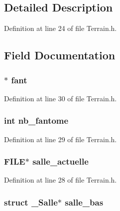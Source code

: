 \subsection{Detailed Description}


Definition at line 24 of file Terrain.\-h.



\subsection{Field Documentation}
\hypertarget{struct___salle_a569b56072a5a66ebf7db5ab24d371550}{
\subsubsection[{fant}]{$\ast$ fant}}\label{struct___salle_a569b56072a5a66ebf7db5ab24d371550}


Definition at line 30 of file Terrain.\-h.

\hypertarget{struct___salle_a47d84eea0555715068bf00a979b77b27}{
\subsubsection[{nb\-\_\-fantome}]{\setlength{\rightskip}{0pt plus 5cm}int nb\-\_\-fantome}}\label{struct___salle_a47d84eea0555715068bf00a979b77b27}


Definition at line 29 of file Terrain.\-h.

\hypertarget{struct___salle_a9b2eab48569631cecdd9c2193f6c0200}{
\subsubsection[{salle\-\_\-actuelle}]{\setlength{\rightskip}{0pt plus 5cm}F\-I\-L\-E$\ast$ salle\-\_\-actuelle}}\label{struct___salle_a9b2eab48569631cecdd9c2193f6c0200}


Definition at line 28 of file Terrain.\-h.

\hypertarget{struct___salle_aa68ee082aa9dcc1ea99c09f46c2b002d}{
\subsubsection[{salle\-\_\-bas}]{\setlength{\rightskip}{0pt plus 5cm}struct {\bf \-\_\-\-Salle}$\ast$ salle\-\_\-bas}}\label{struct___salle_aa68ee082aa9dcc1ea99c09f46c2b002d}


